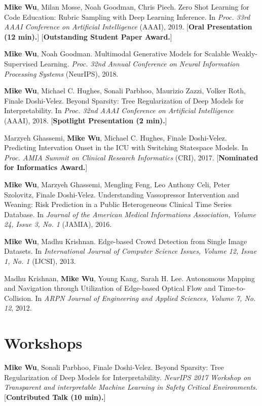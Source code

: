 \documentclass[margin, 10pt]{res} %
\begin{document}
\begin{resume}
\textbf{Mike Wu}, Milan Mosse, Noah Goodman, Chris Piech. Zero Shot Learning for Code Education: Rubric Sampling with Deep Learning Inference. In \textit{Proc. 33rd AAAI Conference on Artificial Intelligence} (AAAI), 2019. [\textbf{Oral Presentation (12 min).}] [\textbf{Outstanding Student Paper Award.}]

\textbf{Mike Wu}, Noah Goodman. Multimodal Generative Models for Scalable Weakly-Supervised Learning. \textit{Proc. 32nd Annual Conference on Neural Information Processing Systems} (NeurIPS), 2018.

\textbf{Mike Wu}, Michael C. Hughes, Sonali Parbhoo, Maurizio Zazzi, Volker Roth, Finale Doshi-Velez. Beyond Sparsity: Tree Regularization of Deep Models for Interpretability. In \textit{Proc. 32nd AAAI Conference on Artificial Intelligence} (AAAI), 2018. [\textbf{Spotlight Presentation (2 min).}]

Marzyeh Ghassemi, \textbf{Mike Wu}, Michael C. Hughes, Finale Doshi-Velez. Predicting Intervation Onset in the ICU with Switching Statespace Models. In \textit{Proc. AMIA Summit on Clinical Research Informatics} (CRI), 2017. [\textbf{Nominated for Informatics Award.}]

\textbf{Mike Wu}, Marzyeh Ghassemi, Mengling Feng, Leo Anthony Celi, Peter Szolovitz, Finale Doshi-Velez. Understanding Vassopressor Intervention and Weaning: Risk Prediction in a Public Heterogeneous Clinical Time Series Database. In \textit{Journal of the American Medical Informations Association, Volume 24, Issue 3, No. 1} (JAMIA), 2016.

\textbf{Mike Wu}, Madhu Krishnan. Edge-based Crowd Detection from Single Image Datasets. In \textit{International Journal of Computer Science Issues, Volume 12, Issue 1, No. 1} (IJCSI), 2013.

Madhu Krishnan, \textbf{Mike Wu}, Young Kang, Sarah H. Lee. Autonomous Mapping and Navigation through Utilization of Edge-based Optical Flow and Time-to-Collision. In \textit{ARPN Journal of Engineering and Applied Sciences, Volume 7, No. 12}, 2012.

\section{Workshops}

\textbf{Mike Wu}, Sonali Parbhoo, Finale Doshi-Velez. Beyond Sparsity: Tree Regularization of Deep Models for Interpretability. \textit{NeurIPS 2017 Workshop on Transparent and interpretable Machine Learning in Safety Critical Environments}. [\textbf{Contributed Talk (10 min).}]


\end{resume}
\end{document}
